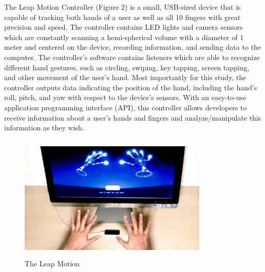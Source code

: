 \documentclass[letterpaper,english, 12pt]{article}
\begin{document}
The Leap Motion Controller (Figure 2) is a small, USB-sized device that is capable of tracking both hands of a user as well as all 10 fingers with great precision and speed. The controller contains LED lights and camera sensors which are constantly scanning a hemi-spherical volume with a diameter of 1 meter  and centered on the device, recording information, and sending data to the computer. The controller's software contains listeners which are able to recognize different hand gestures, such as circling, swiping, key tapping, screen tapping, and other movement of the user's hand. Most importantly for this study, the controller outputs data indicating the position of the hand, including the hand's roll, pitch, and yaw with respect to the device's sensors. With an easy-to-use application programming interface (API), this controller allows developers to receive information about a user's hands and fingers and analyze/manipulate this information as they wish.

\begin{figure}[t]
	\centering
	\includegraphics[height=6cm,width=90mm]{pics/leap.jpg}
	\caption{The Leap Motion}
\end{figure}
\end{document}
